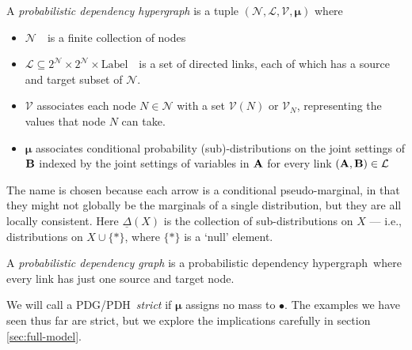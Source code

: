 \documentclass{article}
\newcommand\bmu{\boldsymbol{\mu}}
\newcommand{\V}{\mathcal V}
\newcommand{\N}{\mathcal N}
\newcommand{\Li}{\mathcal L}
\newcommand{\modelname}{probabilistic dependency graph}
\newcommand{\modelnamehyper}{probabilistic dependency hypergraph}
\newcommand{\MN}{PDG}
\newcommand{\MNH}{PDH}
\begin{document}
	
	\def\mnvars[#1]{(\mathcal N#1, \mathcal L#1, \mathcal V#1, \bmu#1)}
	\begin{defn}[\MNH]\label{def:hypermodel}
		A \emph{\modelnamehyper} is a tuple $\mnvars[]$ where
		\begin{itemize}[nosep]
			\item $\N$~~is a finite collection of nodes
			\item $\Li \subseteq 2^{\N} \times 2^{\N} \times \mathrm{Label}$~~is a set of directed links, each of which has a source and target subset of $\N$.
			\item $\V$ associates each node $N \in \mathcal N$ with a set $\V(N)$ or $\V_N$, representing the values that node $N$ can take.
			\item $\bmu$
			associates conditional probability (sub)-distributions on the joint settings of $\bf B$ indexed by the joint settings of variables in $\bf A$ for every link $({\bf A,B}) \in \mathcal L$ %
		\end{itemize}

	\end{defn}

	The name is chosen because each arrow is a conditional pseudo-marginal, in that they might not
	globally be the marginals of a single distribution, but they are all locally consistent. 
	Here $\underline\Delta(X)$ is the collection of sub-distributions on $X$ --- i.e., distributions on $X \cup \{*\}$, where $\{*\}$ is a `null' element. 

	\begin{defn}[\MN]\label{def:model}
		A \textit{\modelname} is a \modelnamehyper\ where every link has just one source and target node.
	\end{defn}

	We will call a \MN/\MNH\ \emph{strict} if $\bmu$ assigns no mass to $\bullet$. The examples we have seen thus far are strict, but we explore the implications carefully in section \ref{sec:full-model}.

	
	




	
\end{document}
